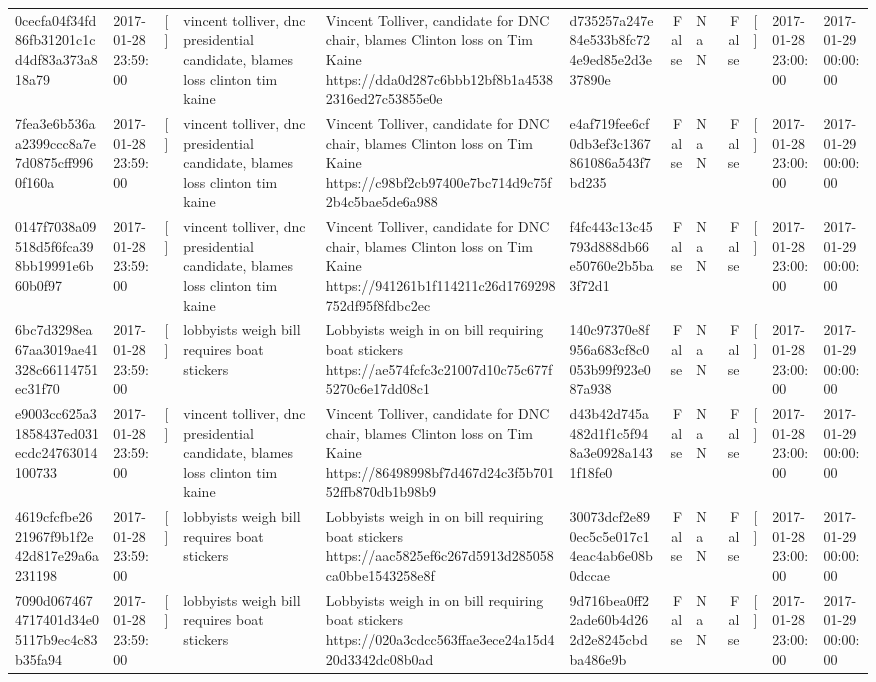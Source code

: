 \begin{tabular}{llllllrlrlll}
0cecfa04f34fd86fb31201c1cd4df83a373a818a79 & 2017-01-28 23:59:00 & [] & vincent tolliver, dnc presidential candidate, blames loss clinton tim kaine & Vincent Tolliver, candidate for DNC chair, blames Clinton loss on Tim Kaine https://dda0d287c6bbb12bf8b1a45382316ed27c53855e0e & d735257a247e84e533b8fc724e9ed85e2d3e37890e & False & NaN & False & [] & 2017-01-28 23:00:00 & 2017-01-29 00:00:00 \\
7fea3e6b536aa2399ccc8a7e7d0875cff9960f160a & 2017-01-28 23:59:00 & [] & vincent tolliver, dnc presidential candidate, blames loss clinton tim kaine & Vincent Tolliver, candidate for DNC chair, blames Clinton loss on Tim Kaine https://c98bf2cb97400e7bc714d9c75f2b4c5bae5de6a988 & e4af719fee6cf0db3ef3c1367861086a543f7bd235 & False & NaN & False & [] & 2017-01-28 23:00:00 & 2017-01-29 00:00:00 \\
0147f7038a09518d5f6fca398bb19991e6b60b0f97 & 2017-01-28 23:59:00 & [] & vincent tolliver, dnc presidential candidate, blames loss clinton tim kaine & Vincent Tolliver, candidate for DNC chair, blames Clinton loss on Tim Kaine https://941261b1f114211c26d1769298752df95f8fdbc2ec & f4fc443c13c45793d888db66e50760e2b5ba3f72d1 & False & NaN & False & [] & 2017-01-28 23:00:00 & 2017-01-29 00:00:00 \\
6bc7d3298ea67aa3019ae41328c66114751ec31f70 & 2017-01-28 23:59:00 & [] & lobbyists weigh bill requires boat stickers & Lobbyists weigh in on bill requiring boat stickers https://ae574fcfc3c21007d10c75c677f5270c6e17dd08c1 & 140c97370e8f956a683cf8c0053b99f923e087a938 & False & NaN & False & [] & 2017-01-28 23:00:00 & 2017-01-29 00:00:00 \\
e9003cc625a31858437ed031ecdc24763014100733 & 2017-01-28 23:59:00 & [] & vincent tolliver, dnc presidential candidate, blames loss clinton tim kaine & Vincent Tolliver, candidate for DNC chair, blames Clinton loss on Tim Kaine https://86498998bf7d467d24c3f5b70152ffb870db1b98b9 & d43b42d745a482d1f1c5f948a3e0928a1431f18fe0 & False & NaN & False & [] & 2017-01-28 23:00:00 & 2017-01-29 00:00:00 \\
4619cfcfbe2621967f9b1f2e42d817e29a6a231198 & 2017-01-28 23:59:00 & [] & lobbyists weigh bill requires boat stickers & Lobbyists weigh in on bill requiring boat stickers https://aac5825ef6c267d5913d285058ca0bbe1543258e8f & 30073dcf2e890ec5c5e017c14eac4ab6e08b0dccae & False & NaN & False & [] & 2017-01-28 23:00:00 & 2017-01-29 00:00:00 \\
7090d0674674717401d34e05117b9ec4c83b35fa94 & 2017-01-28 23:59:00 & [] & lobbyists weigh bill requires boat stickers & Lobbyists weigh in on bill requiring boat stickers https://020a3cdcc563ffae3ece24a15d420d3342dc08b0ad & 9d716bea0ff22ade60b4d262d2e8245cbdba486e9b & False & NaN & False & [] & 2017-01-28 23:00:00 & 2017-01-29 00:00:00 \\

\end{tabular}
